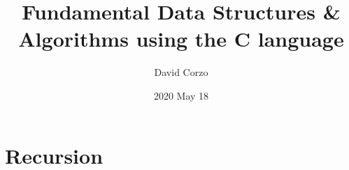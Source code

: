 \documentclass[openany]{book}
\title{\Huge Fundamental Data Structures \& Algorithms using the C language}
\date{2020 May 18} %
\author{David Corzo}
\begin{document}
\maketitle 
\tableofcontents

% 

% 

% 

% 

% 

% 

% 

% 

% 

% 

\chapter{Recursion}


\end{document}
